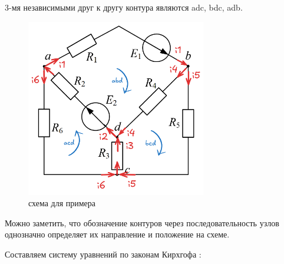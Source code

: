 3-мя независимыми друг к другу контура являются adc, bdc, adb.

\begin{figure}[H]
    \centering
    \includegraphics[width=0.7\textwidth]{images/Klaws_kontours_nodes.png}
    \caption{схема для примера}
    \label{fig:example}
\end{figure}

Можно заметить, что обозначение контуров через последовательность узлов однозначно определяет их направление и положение на схеме.


Составляем систему уравнений по законам Кирхгофа :
